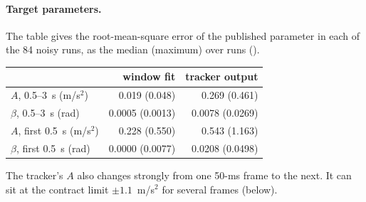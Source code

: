 \documentclass[11pt]{article}
\begin{document}
\paragraph{Target parameters.} The table gives the root-mean-square error of
the published parameter in each of the 84 noisy runs, as the median (maximum)
over runs
().
\begin{center}
\begin{tabular}{lrr}
\toprule
 & window fit & tracker output\\
\midrule
$A$, 0.5--3~s (m/s$^2$) & 0.019 (0.048) & 0.269 (0.461)\\
$\beta$, 0.5--3~s (rad) & 0.0005 (0.0013) & 0.0078 (0.0269)\\
$A$, first 0.5~s (m/s$^2$) & 0.228 (0.550) & 0.543 (1.163)\\
$\beta$, first 0.5~s (rad) & 0.0000 (0.0077) & 0.0208 (0.0498)\\
\bottomrule
\end{tabular}
\end{center}
The tracker's $A$ also changes strongly from one 50-ms frame to the next. It
can sit at the contract limit $\pm1.1$~m/s$^2$ for several frames (below).
\end{document}
